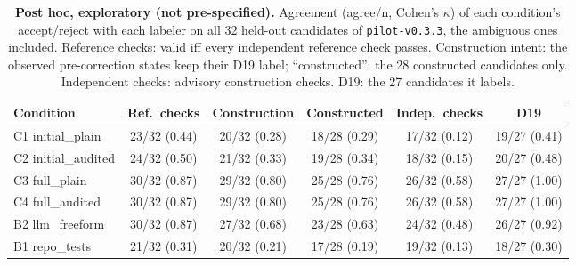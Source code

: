 \begin{table}[t]\centering\footnotesize
\caption{\textbf{Post hoc, exploratory (not pre-specified).} Agreement (agree/n, Cohen's $\kappa$) of each condition's accept/reject with each labeler on all 32 held-out candidates of \texttt{pilot-v0.3.3}, the ambiguous ones included. Reference checks: valid iff every independent reference check passes. Construction intent: the observed pre-correction states keep their D19 label; ``constructed'': the 28 constructed candidates only. Independent checks: advisory construction checks. D19: the 27 candidates it labels.}\label{tab:expl-agreement}
\begin{tabular}{lccccc}\toprule Condition & Ref.\ checks & Construction & Constructed & Indep.\ checks & D19 \\\midrule
C1 initial\_plain & 23/32 (0.44) & 20/32 (0.28) & 18/28 (0.29) & 17/32 (0.12) & 19/27 (0.41) \\
C2 initial\_audited & 24/32 (0.50) & 21/32 (0.33) & 19/28 (0.34) & 18/32 (0.15) & 20/27 (0.48) \\
C3 full\_plain & 30/32 (0.87) & 29/32 (0.80) & 25/28 (0.76) & 26/32 (0.58) & 27/27 (1.00) \\
C4 full\_audited & 30/32 (0.87) & 29/32 (0.80) & 25/28 (0.76) & 26/32 (0.58) & 27/27 (1.00) \\
B2 llm\_freeform & 30/32 (0.87) & 27/32 (0.68) & 23/28 (0.63) & 24/32 (0.48) & 26/27 (0.92) \\
B1 repo\_tests & 21/32 (0.31) & 20/32 (0.21) & 17/28 (0.19) & 19/32 (0.13) & 18/27 (0.30) \\
\bottomrule\end{tabular}\end{table}
